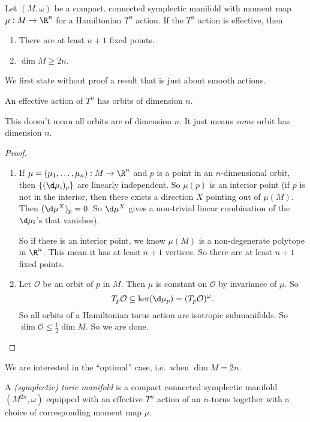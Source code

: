 \documentclass[a4paper]{article}
\begin{document}
\begin{prop}
  Let $(M, \omega)$ be a compact, connected symplectic manifold with moment map $\mu: M \to \R^n$ for a Hamiltonian $T^n$ action. If the $T^n$ action is effective, then
  \begin{enumerate}
    \item There are at least $n + 1$ fixed points.
    \item $\dim M \geq 2n$.
  \end{enumerate}
\end{prop}

We first state without proof a result that is just about smooth actions.
\begin{fact}
  An effective action of $T^n$ has orbits of dimension $n$.\fakeqed
\end{fact}
This doesn't mean all orbits are of dimension $n$. It just means \emph{some} orbit has dimension $n$.

\begin{proof}\leavevmode
  \begin{enumerate}
    \item If $\mu = (\mu_1, \ldots, \mu_n): M \to \R^n$ and $p$ is a point in an $n$-dimensional orbit, then $\{(\d \mu_i)_p\}$ are linearly independent. So $\mu(p)$ is an interior point (if $p$ is not in the interior, then there exists a direction $X$ pointing out of $\mu(M)$. Then $(\d \mu^X)_p = 0$. So $\d \mu^X$ gives a non-trivial linear combination of the $\d \mu_i$'s that vanishes).

      So if there is an interior point, we know $\mu(M)$ is a non-degenerate polytope in $\R^n$. This mean it has at least $n + 1$ vertices. So there are at least $n + 1$ fixed points.
    \item Let $\mathcal{O}$ be an orbit of $p$ in $M$. Then $\mu$ is constant on $\mathcal{O}$ by invariance of $\mu$. So
      \[
        T_p \mathcal{O} \subseteq \ker (\d \mu_p) = (T_p \mathcal{O})^\omega.
      \]
      So all orbits of a Hamiltonian torus action are isotropic submanifolds. So $\dim \mathcal{O} \leq \frac{1}{2}\dim M$. So we are done.\qedhere
  \end{enumerate}
\end{proof}

We are interested in the ``optimal'' case, i.e.\ when $\dim M = 2n$.
\begin{defi}
  A \emph{(symplectic) toric manifold} is a compact connected symplectic manifold $(M^{2n}, \omega)$ equipped with an effective $T^n$ action of an $n$-torus together with a choice of corresponding moment map $\mu$.
\end{defi}
\end{document}

